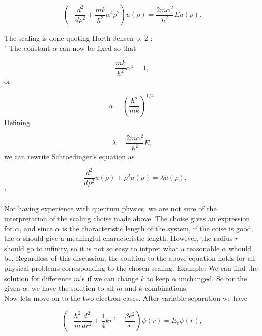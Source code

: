 \documentclass{article}
\begin{document}
\begin{equation}\label{eq:1electronIntermediate}
\left ( -\frac{d^2}{d\rho^2} 
+ \frac{mk}{\hbar^2} \alpha^4\rho^2\right ) u(\rho)  = \frac{2m\alpha^2}{\hbar^2}E u(\rho).
\end{equation}

The scaling is done quoting Horth-Jensen \cite{MHJProject2} p. 2 :\\

"
The constant $\alpha$ can now be fixed
so that

\begin{equation*}
\frac{mk}{\hbar^2} \alpha^4 = 1,
\end{equation*}
or

\begin{equation*}
\alpha = \left(\frac{\hbar^2}{mk}\right)^{1/4}.
\end{equation*}
Defining

\begin{equation*}
\lambda = \frac{2m\alpha^2}{\hbar^2}E,
\end{equation*}
we can rewrite Schroedinger's equation as

\begin{equation}\label{eq:oneElectronScaled}
-\frac{d^2}{d\rho^2} u(\rho) + \rho^2u(\rho)  = \lambda u(\rho) .
\end{equation}"

Not having experience with quentum physics, we are not sure of the interpretation of the scaling choise made above. The choise gives an expression for $\alpha$, and since $\alpha$ is the characteristic length of the system, if the coise is good, the $\alpha$ should give a meaningful characteristic length. However, the radius $r$ should go to infinity, so it is not so easy to intpret what a reasonable $\alpha$ whould be. Regardless of this discussion, the soultion to the above equation holds for all physical problems corresponding to the chosen scaling. Example: We can find the solution for difference $m$'s if we can change $k$ to keep $\alpha$ unchanged. So for the given $\alpha$, we have the solution to all $m$ and $k$ combinations.\\

Now lets move on to the two electron cases. After variable separation we have

\begin{equation}\label{eq:twoElectronUnscaled}
\left(  -\frac{\hbar^2}{m} \frac{d^2}{dr^2}+ \frac{1}{4}k r^2+\frac{\beta e^2}{r}\right)\psi(r)  = E_r \psi(r),
\end{equation}
\end{document}
